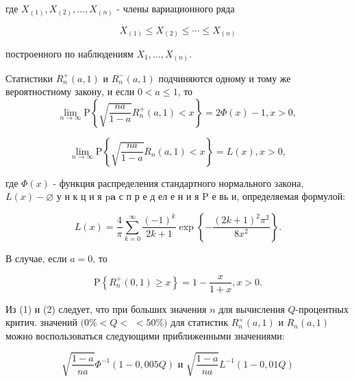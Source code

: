 \documentclass[10pt]{article}
\begin{document}
где $X_{(1)}, X_{(2)}, \ldots, X_{(n)}$ - члены вариационного ряда



\[

X_{(1)} \leqslant X_{(2)} \leqslant \cdots \leqslant X_{(n)}

\]



построенного по наблюдениям $X_{1}, \ldots, X_{(n)}$.



Статистики $R_{n}^{+}(a, 1)$ и $R_{n}^{-}(a, 1)$ подчиняются одному и тому же вероятностному закону, и если $0<a \leqslant 1$, то\[

\lim _{n \rightarrow \infty} \mathrm{P}\left\{\sqrt{\frac{n a}{1-a}} R_{n}^{+}(a, 1)<x\right\}=2 \Phi(x)-1, x>0 \text {, }

\]



\[

\lim _{n \rightarrow \infty} \mathrm{P}\left\{\sqrt{\frac{n a}{1-a}} R_{n}(a, 1)<x\right\}=L(x), x>0,

\]



где $\Phi(x)$ - функция распределения стандартного нормального закона, $L(x)-\varnothing$ у н к ц и я $\mathrm{p} \mathbf{a}$ с п р е д ел е н и я $\mathrm{P}$ е вь и, определяемая формулой:



\[

L(x)=\frac{4}{\pi} \sum_{k=0}^{\infty} \frac{(-1)^{k}}{2 k+1} \exp \left\{-\frac{(2 k+1)^{2} \pi^{2}}{8 x^{2}}\right\} .

\]



В случае, если $a=0$, то



\[

\mathrm{P}\left\{R_{n}^{+}(0,1) \geqslant x\right\}=1-\frac{x}{1+x}, x>0 .

\]



Из (1) и (2) следует, что при больших значения $n$ для вычисления $Q$-процентных критич. значений $(0 \%<Q<$ $<50 \%)$ для статистик $R_{n}^{+}(a, 1)$ и $R_{n}(a, 1)$ можно воспользоваться следующими приближенными значениями:



\[

\sqrt{\frac{1-a}{n a}} \Phi^{-1}(1-0,005 Q) \text { и } \sqrt{\frac{1-a}{n a}} L^{-1}(1-0,01 Q)

\]
\end{document}
